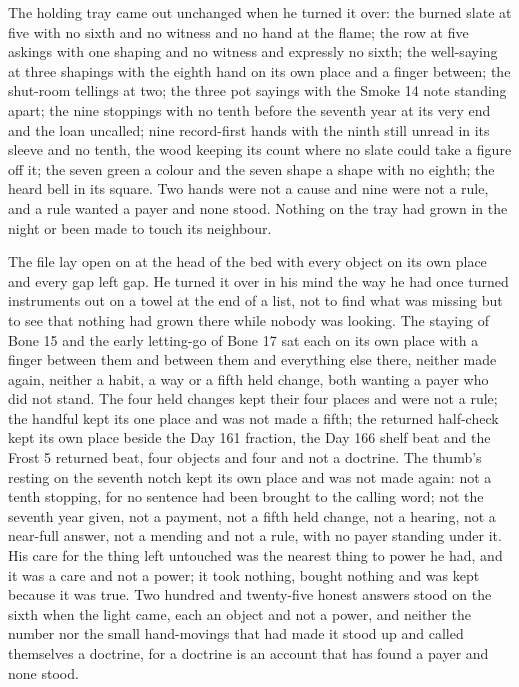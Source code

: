 The holding tray came out unchanged when he turned it over: the burned slate at five with no sixth and no witness and no hand at the flame; the row at five askings with one shaping and no witness and expressly no sixth; the well-saying at three shapings with the eighth hand on its own place and a finger between; the shut-room tellings at two; the three pot sayings with the Smoke 14 note standing apart; the nine stoppings with no tenth before the seventh year at its very end and the loan uncalled; nine record-first hands with the ninth still unread in its sleeve and no tenth, the wood keeping its count where no slate could take a figure off it; the seven green a colour and the seven shape a shape with no eighth; the heard bell in its square. Two hands were not a cause and nine were not a rule, and a rule wanted a payer and none stood. Nothing on the tray had grown in the night or been made to touch its neighbour.

The file lay open on  at the head of the bed with every object on its own place and every gap left gap. He turned it over in his mind the way he had once turned instruments out on a towel at the end of a list, not to find what was missing but to see that nothing had grown there while nobody was looking. The staying of Bone 15 and the early letting-go of Bone 17 sat each on its own place with a finger between them and between them and everything else there, neither made again, neither a habit, a way or a fifth held change, both wanting a payer who did not stand. The four held changes kept their four places and were not a rule; the handful kept its one place and was not made a fifth; the returned half-check kept its own place beside the Day 161 fraction, the Day 166 shelf beat and the Frost 5 returned beat, four objects and four and not a doctrine. The thumb's resting on the seventh notch kept its own place and was not made again: not a tenth stopping, for no sentence had been brought to the calling word; not the seventh year given, not a payment, not a fifth held change, not a hearing, not a near-full answer, not a mending and not a rule, with no payer standing under it. His care for the thing left untouched was the nearest thing to power he had, and it was a care and not a power; it took nothing, bought nothing and was kept because it was true. Two hundred and twenty-five honest answers stood on the sixth when the light came, each an object and not a power, and neither the number nor the small hand-movings that had made it stood up and called themselves a doctrine, for a doctrine is an account that has found a payer and none stood.

